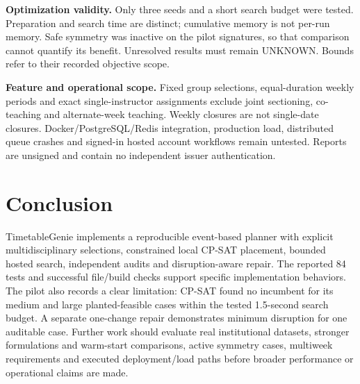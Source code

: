 \documentclass[pdflatex,sn-mathphys-num]{sn-jnl}
\theoremstyle{thmstyleone}
\theoremstyle{thmstyletwo}
\theoremstyle{thmstylethree}
\begin{document}
\textbf{Optimization validity.} Only three seeds and a short search budget were tested. Preparation and search time are distinct; cumulative memory is not per-run memory. Safe symmetry was inactive on the pilot signatures, so that comparison cannot quantify its benefit. Unresolved results must remain UNKNOWN. Bounds refer to their recorded objective scope.

\textbf{Feature and operational scope.} Fixed group selections, equal-duration weekly periods and exact single-instructor assignments exclude joint sectioning, co-teaching and alternate-week teaching. Weekly closures are not single-date closures. Docker/PostgreSQL/Redis integration, production load, distributed queue crashes and signed-in hosted account workflows remain untested. Reports are unsigned and contain no independent issuer authentication.

\section{Conclusion}\label{sec:conclusion}

TimetableGenie implements a reproducible event-based planner with explicit multidisciplinary selections, constrained local CP-SAT placement, bounded hosted search, independent audits and disruption-aware repair. The reported 84 tests and successful file/build checks support specific implementation behaviors. The pilot also records a clear limitation: CP-SAT found no incumbent for its medium and large planted-feasible cases within the tested 1.5-second search budget. A separate one-change repair demonstrates minimum disruption for one auditable case. Further work should evaluate real institutional datasets, stronger formulations and warm-start comparisons, active symmetry cases, multiweek requirements and executed deployment/load paths before broader performance or operational claims are made.

\backmatter
\end{document}
